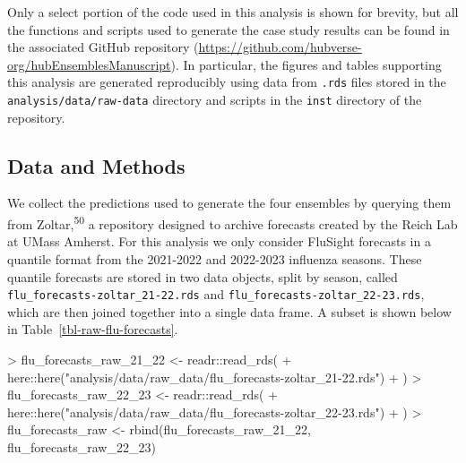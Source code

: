 \documentclass[
]{article}
\newenvironment{Shaded}{\begin{snugshade}}{\end{snugshade}}
\newcommand{\FunctionTok}[1]{\textcolor[rgb]{0.28,0.35,0.67}{#1}}
\newcommand{\NormalTok}[1]{\textcolor[rgb]{0.00,0.23,0.31}{#1}}
\newcommand{\OtherTok}[1]{\textcolor[rgb]{0.00,0.23,0.31}{#1}}
\newcommand{\SpecialCharTok}[1]{\textcolor[rgb]{0.37,0.37,0.37}{#1}}
\newcommand{\StringTok}[1]{\textcolor[rgb]{0.13,0.47,0.30}{#1}}
\begin{document}
Only a select portion of the code used in this analysis is shown for
brevity, but all the functions and scripts used to generate the case
study results can be found in the associated GitHub repository
(\url{https://github.com/hubverse-org/hubEnsemblesManuscript}). In
particular, the figures and tables supporting this analysis are
generated reproducibly using data from \texttt{.rds} files stored in the
\texttt{analysis/data/raw-data} directory and scripts in the
\texttt{inst} directory of the repository.

\subsection{Data and Methods}\label{data-and-methods}

We collect the predictions used to generate the four ensembles by
querying them from Zoltar,\textsuperscript{50} a repository designed to
archive forecasts created by the Reich Lab at UMass Amherst. For this
analysis we only consider FluSight forecasts in a quantile format from
the 2021-2022 and 2022-2023 influenza seasons. These quantile forecasts
are stored in two data objects, split by season, called
\texttt{flu\_forecasts-zoltar\_21-22.rds} and
\texttt{flu\_forecasts-zoltar\_22-23.rds}, which are then joined
together into a single data frame. A subset is shown below in
Table~\ref{tbl-raw-flu-forecasts}.

\begin{Shaded}
\begin{Highlighting}[]
\SpecialCharTok{\textgreater{}}\NormalTok{ flu\_forecasts\_raw\_21\_22 }\OtherTok{\textless{}{-}}\NormalTok{ readr}\SpecialCharTok{::}\FunctionTok{read\_rds}\NormalTok{(}
\SpecialCharTok{+}\NormalTok{   here}\SpecialCharTok{::}\FunctionTok{here}\NormalTok{(}\StringTok{"analysis/data/raw\_data/flu\_forecasts{-}zoltar\_21{-}22.rds"}\NormalTok{)}
\SpecialCharTok{+}\NormalTok{ )}
\SpecialCharTok{\textgreater{}}\NormalTok{ flu\_forecasts\_raw\_22\_23 }\OtherTok{\textless{}{-}}\NormalTok{ readr}\SpecialCharTok{::}\FunctionTok{read\_rds}\NormalTok{(}
\SpecialCharTok{+}\NormalTok{   here}\SpecialCharTok{::}\FunctionTok{here}\NormalTok{(}\StringTok{"analysis/data/raw\_data/flu\_forecasts{-}zoltar\_22{-}23.rds"}\NormalTok{)}
\SpecialCharTok{+}\NormalTok{ )}
\SpecialCharTok{\textgreater{}}\NormalTok{ flu\_forecasts\_raw }\OtherTok{\textless{}{-}} \FunctionTok{rbind}\NormalTok{(flu\_forecasts\_raw\_21\_22, flu\_forecasts\_raw\_22\_23)}
\end{Highlighting}
\end{Shaded}
\end{document}
